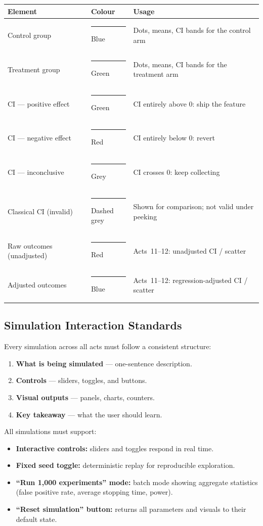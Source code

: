 \documentclass[12pt, a4paper]{article}
\begin{document}
\begin{center}
\renewcommand{\arraystretch}{1.3}
\begin{tabular}{@{} l l l @{}}
\toprule
\textbf{Element} & \textbf{Colour} & \textbf{Usage} \\
\midrule
Control group & \textcolor{blue}{\rule{1em}{1em}} Blue
  & Dots, means, CI bands for the control arm \\
Treatment group & \textcolor{green!60!black}{\rule{1em}{1em}} Green
  & Dots, means, CI bands for the treatment arm \\
CI --- positive effect & \textcolor{green!60!black}{\rule{1em}{1em}} Green
  & CI entirely above 0: ship the feature \\
CI --- negative effect & \textcolor{red}{\rule{1em}{1em}} Red
  & CI entirely below 0: revert \\
CI --- inconclusive & \textcolor{gray}{\rule{1em}{1em}} Grey
  & CI crosses 0: keep collecting \\
Classical CI (invalid) & \textcolor{gray}{\rule{1em}{1em}} Dashed grey
  & Shown for comparison; not valid under peeking \\
Raw outcomes (unadjusted) & \textcolor{red!70!black}{\rule{1em}{1em}} Red
  & Acts~11--12: unadjusted CI / scatter \\
Adjusted outcomes & \textcolor{blue}{\rule{1em}{1em}} Blue
  & Acts~11--12: regression-adjusted CI / scatter \\
\bottomrule
\end{tabular}
\end{center}

\subsection{Simulation Interaction Standards}

Every simulation across all acts must follow a consistent structure:
\begin{enumerate}[nosep]
  \item \textbf{What is being simulated} --- one-sentence description.
  \item \textbf{Controls} --- sliders, toggles, and buttons.
  \item \textbf{Visual outputs} --- panels, charts, counters.
  \item \textbf{Key takeaway} --- what the user should learn.
\end{enumerate}

All simulations must support:
\begin{itemize}[nosep]
  \item \textbf{Interactive controls:} sliders and toggles respond in
        real time.
  \item \textbf{Fixed seed toggle:} deterministic replay for reproducible
        exploration.
  \item \textbf{``Run 1,000 experiments'' mode:} batch mode showing
        aggregate statistics (false positive rate, average stopping time,
        power).
  \item \textbf{``Reset simulation'' button:} returns all parameters and
        visuals to their default state.
\end{itemize}
\end{document}
